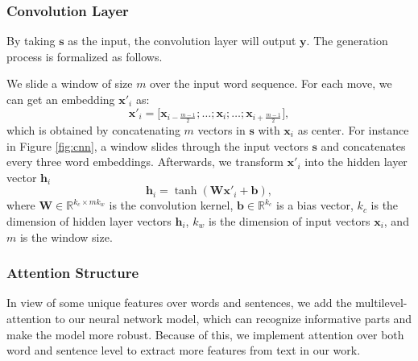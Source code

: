 \documentclass[11pt,a4paper]{article}
\begin{document}
\subsubsection{Convolution Layer}
By taking $\mathbf{s}$ as the input, the convolution layer will output $\mathbf{y}$. The generation process is formalized as follows.

We slide a window of size $m$ over the input word sequence. For each move, we can get an embedding $\mathbf{x}'_i$ as:
\begin{equation}
\mathbf{x}'_i = \big[ \mathbf{x}_{i - \frac{m-1}{2}}; \ldots ; \mathbf{x}_i; \ldots ;\mathbf{x}_{i + \frac{m-1}{2}} \big],
\end{equation}
which is obtained by concatenating $m$ vectors in $\mathbf{s}$ with $\mathbf{x}_i$ as center. For instance in Figure \ref{fig:cnn}, a window slides through the input vectors $\mathbf{s}$ and concatenates every three word embeddings. Afterwards, we transform $\mathbf{x}'_i$ into the hidden layer vector $\mathbf{h}_i$
\begin{equation}
\mathbf{h}_i = \tanh(\mathbf{W}\mathbf{x}'_i + \mathbf{b}),
\end{equation}
where $\mathbf{W} \in \mathbb{R}^{k_c \times mk_w}$ is the convolution kernel, $\mathbf{b} \in \mathbb{R}^{k_c}$ is a bias vector, $k_c$ is the dimension of hidden layer vectors $\mathbf{h}_i$, $k_w$ is the dimension of input vectors $\mathbf{x}_i$, and $m$ is the window size.



\subsubsection{Attention Structure}
In view of some unique features over words and sentences, we add the multilevel-attention to our neural network model, which can recognize informative parts and make the model more robust. Because of this, we implement attention over both word and sentence level to extract more features from text in our work.
\end{document}
